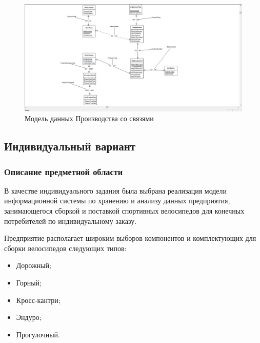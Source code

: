 \documentclass[a4paper,14pt]{extarticle}
\newcommand{\erassistant}{\texttt{ErAssistant}}
\newcommand{\individual}{Индивидуальный вариант}
\begin{document}
\begin{figure}[h!]
	\centering
	\includegraphics[width=0.7\linewidth]{images/1-metod}
	\caption{Модель данных Производства со связями}
	\label{fig:1-metod}
\end{figure}


%

\newpage
\subsection{\individual}
\subsubsection*{Описание предметной области}
В качестве индивидуального задания была выбрана реализация модели информационной системы по хранению и анализу данных  предприятия, занимающегося сборкой и поставкой спортивных велосипедов для конечных потребителей по индивидуальному заказу.

Предприятие располагает широким выборов компонентов и комплектующих для сборки велосипедов следующих типов:
\begin{itemize}
	\item Дорожный;
	\item Горный;
	\item Кросс-кантри;
	\item Эндуро;
	\item Прогулочный.
\end{itemize}
\end{document}
